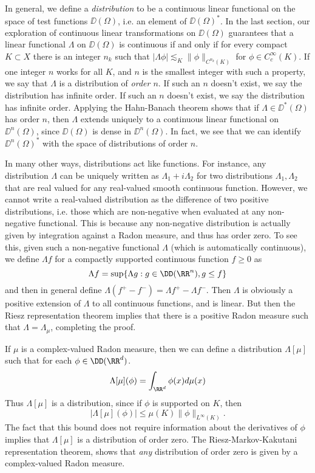 In general, we define a \emph{distribution} to be a continuous linear functional on the space of test functions $\DD(\Omega)$, i.e. an element of $\DD(\Omega)^*$. In the last section, our exploration of continuous linear transformations on $\DD(\Omega)$ guarantees that a linear functional $\Lambda$ on $\DD(\Omega)$ is continuous if and only if for every compact $K \subset X$ there is an integer $n_k$ such that $|\Lambda \phi| \lesssim_K \| \phi \|_{C^{n_k}(K)}$ for $\phi \in C_c^\infty(K)$. If one integer $n$ works for all $K$, and $n$ is the smallest integer with such a property, we say that $\Lambda$ is a distribution of \emph{order $n$}. If such an $n$ doesn't exist, we say the distribution has infinite order. If such an $n$ doesn't exist, we say the distribution has infinite order. Applying the Hahn-Banach theorem shows that if $\Lambda \in \DD^*(\Omega)$ has order $n$, then $\Lambda$ extends uniquely to a continuous linear functional on $\DD^n(\Omega)$, since $\DD(\Omega)$ is dense in $\DD^n(\Omega)$. In fact, we see that we can identify $\DD^n(\Omega)^*$ with the space of distributions of order $n$.

In many other ways, distributions act like functions. For instance, any distribution $\Lambda$ can be uniquely written as $\Lambda_1 + i \Lambda_2$ for two distributions $\Lambda_1, \Lambda_2$ that are real valued for any real-valued smooth continuous function. However, we cannot write a real-valued distribution as the difference of two positive distributions, i.e. those which are non-negative when evaluated at any non-negative functional. This is because any non-negative distribution is actually given by integration against a Radon measure, and thus has order zero. To see this, given such a non-negative functional $\Lambda$ (which is automatically continuous),  we define $\Lambda f$ for a compactly supported continuous function $f \geq 0$ as
%
\[ \Lambda f = \sup \{ \Lambda g: g \in \DD(\RR^n), g \leq f \} \]
%
and then in general define $\Lambda (f^+ - f^-) = \Lambda f^+ - \Lambda f^-$. Then $\Lambda$ is obviously a positive extension of $\Lambda$ to all continuous functions, and is linear. But then the Riesz representation theorem implies that there is a positive Radon measure such that $\Lambda = \Lambda_\mu$, completing the proof.

\begin{example}
    If $\mu$ is a complex-valued Radon measure, then we can define a distribution $\Lambda[\mu]$ such that for each $\phi \in \DD(\RR^d)$.
    \[ \Lambda[\mu](\phi) = \int_{\RR^d} \phi(x) d\mu(x) \]
    Thus $\Lambda[\mu]$ is a distribution, since if $\phi$ is supported on $K$, then
    \[ |\Lambda[\mu](\phi)| \leq \mu(K) \| \phi \|_{L^\infty(K)}. \]
    The fact that this bound does not require information about the derivatives of $\phi$ implies that $\Lambda[\mu]$ is a distribution of order zero. The Riesz-Markov-Kakutani representation theorem, shows that \emph{any} distribution of order zero is given by a complex-valued Radon measure.
\end{example}

